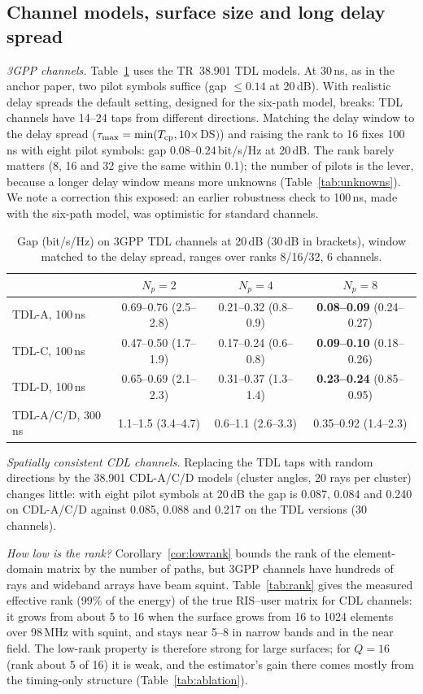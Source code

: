 \subsection{Channel models, surface size and long delay spread}\label{sec:res-chan}
\emph{3GPP channels.} Table~\ref{tab:tdl} uses the TR~38.901 TDL models. At 30\,ns, as in the
anchor paper, two pilot symbols suffice (gap $\le0.14$ at 20\,dB). With realistic delay spreads
the default setting, designed for the six-path model, breaks: TDL channels have 14--24 taps from
different directions. Matching the delay window to the delay spread
($\tau_{\max}=\min(T_{\rm cp},10\times$DS$)$) and raising the rank to 16 fixes 100\,ns with eight
pilot symbols: gap 0.08--0.24\,bit/s/Hz at 20\,dB. The rank barely matters (8, 16 and 32 give
the same within 0.1); the number of pilots is the lever, because a longer delay window means more
unknowns (Table~\ref{tab:unknowns}). We note a correction this exposed: an earlier robustness check
to 100\,ns, made with the six-path model, was optimistic for standard channels.

\begin{table}[!htbp]\centering
\caption{Gap (bit/s/Hz) on 3GPP TDL channels at 20\,dB (30\,dB in brackets), window matched to the delay spread, ranges over ranks 8/16/32, 6 channels.}\label{tab:tdl}
\begin{tabular}{lccc}\toprule
 & $N_p=2$ & $N_p=4$ & $N_p=8$ \\\midrule
TDL-A, 100\,ns & 0.69--0.76 (2.5--2.8) & 0.21--0.32 (0.8--0.9) & \textbf{0.08--0.09} (0.24--0.27) \\
TDL-C, 100\,ns & 0.47--0.50 (1.7--1.9) & 0.17--0.24 (0.6--0.8) & \textbf{0.09--0.10} (0.18--0.26) \\
TDL-D, 100\,ns & 0.65--0.69 (2.1--2.3) & 0.31--0.37 (1.3--1.4) & \textbf{0.23--0.24} (0.85--0.95) \\
TDL-A/C/D, 300\,ns & 1.1--1.5 (3.4--4.7) & 0.6--1.1 (2.6--3.3) & 0.35--0.92 (1.4--2.3) \\\bottomrule
\end{tabular}
\end{table}

\emph{Spatially consistent CDL channels.} Replacing the TDL taps with random directions by the 38.901 CDL-A/C/D
models (cluster angles, 20 rays per cluster) changes little: with eight pilot symbols at 20\,dB the gap is 0.087, 0.084
and 0.240 on CDL-A/C/D against 0.085, 0.088 and 0.217 on the TDL versions (30 channels).

\emph{How low is the rank?} Corollary~\ref{cor:lowrank} bounds the rank of the element-domain matrix by the number of
paths, but 3GPP channels have hundreds of rays and wideband arrays have beam squint. Table~\ref{tab:rank} gives the
measured effective rank (99\% of the energy) of the true RIS--user matrix for CDL channels: it grows from about 5 to 16
when the surface grows from 16 to 1024 elements over 98\,MHz with squint, and stays near 5--8 in narrow bands and in the
near field. The low-rank property is therefore strong for large surfaces; for $Q=16$ (rank about 5 of 16) it is weak,
and the estimator's gain there comes mostly from the timing-only structure (Table~\ref{tab:ablation}).

